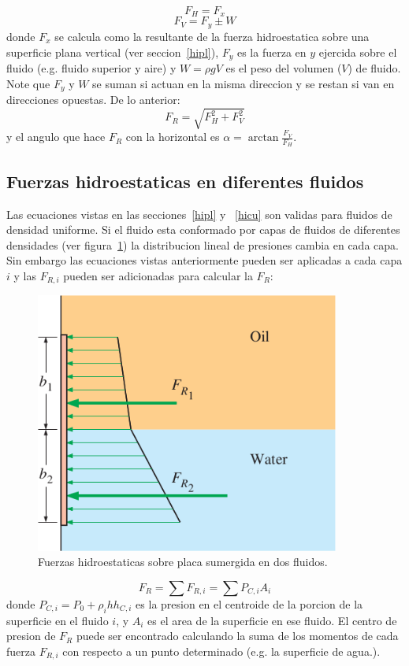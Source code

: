 \documentclass[10pt, oneside]{article}
\begin{document}
$$
F_H=F_x
$$
$$
F_V = F_y \pm W
$$
donde $F_x$ se calcula como la resultante de la fuerza hidroestatica sobre una superficie plana vertical (ver seccion~\ref{hipl}), $F_y$ es la fuerza en $y$ ejercida sobre el fluido (e.g. fluido superior y aire) y $W = \rho g V$ es el peso del volumen ($V$) de fluido. Note que $F_y$ y $W$ se suman si actuan en la misma direccion y se restan si van en direcciones opuestas. De lo anterior:
$$
F_R=\sqrt{F^2_H + F^2_V}
$$
y el angulo que hace $F_R$ con la horizontal es $\alpha = \arctan \frac{F_V}{F_H}$.


\subsection{Fuerzas hidroestaticas en diferentes fluidos}
Las ecuaciones vistas en las secciones~\ref{hipl} y ~\ref{hicu} son validas para fluidos de densidad uniforme. Si el fluido esta conformado por capas de fluidos de diferentes densidades (ver figura~\ref{mden}) la distribucion lineal de presiones cambia en cada capa. Sin embargo las ecuaciones vistas anteriormente pueden ser aplicadas a cada capa $i$ y las $F_{R,i}$ pueden ser adicionadas para calcular la $F_R$:
\begin{figure}[h]
\centering
\includegraphics[width=10cm]{mden}
\caption{Fuerzas hidroestaticas sobre placa sumergida en dos fluidos.}
\label{mden}
\end{figure}


$$
F_R = \sum F_{R,i} = \sum P_{C,i}A_i
$$
donde $P_{C,i} =  P_0 + \rho_i h h_{C,i}$ es la presion en el centroide de la porcion de la superficie en el fluido $i$, y $A_i$ es el area de la superficie en ese fluido. El centro de presion de $F_R$ puede ser encontrado calculando la suma de los momentos de cada fuerza $F_{R,i}$ con respecto a un punto determinado (e.g. la superficie de agua.).
\end{document}
